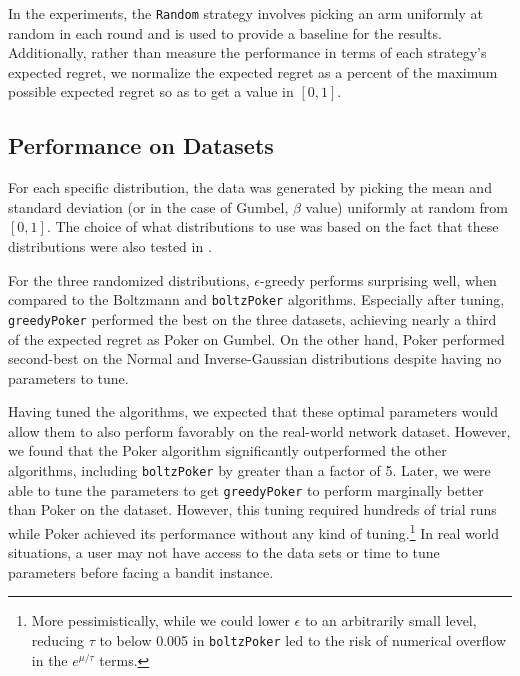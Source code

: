 \documentclass[12pt]{article}
\begin{document}
In the experiments, the \texttt{Random} strategy involves picking an arm uniformly at random in each round and is used to provide a baseline for the results.  Additionally,
rather than measure the performance in terms of each strategy's expected regret, we normalize the expected regret as a percent of the maximum possible expected regret so as to get a value in $[0,1]$. 

\subsection{Performance on Datasets}
For each specific distribution, the data was generated by picking the mean and standard deviation (or in the case of Gumbel, $\beta$ value) uniformly at random from $[0,1]$.  The choice of what
distributions to use was based on the fact that these distributions were also tested in \cite{Kuleshov}. 

For the three randomized distributions, $\epsilon$-greedy performs surprising well, when compared to the Boltzmann and \texttt{boltzPoker} algorithms.  Especially after tuning, 
\texttt{greedyPoker} performed the best on the three datasets, achieving nearly a third of the expected regret as Poker on Gumbel.  On the other hand, Poker performed second-best
on the Normal and Inverse-Gaussian distributions despite having no parameters to tune.

Having tuned the algorithms, we expected that these optimal parameters would allow them to also perform favorably on the real-world network dataset. However, we found that
the Poker algorithm significantly outperformed the other algorithms, including \texttt{boltzPoker} by greater than a factor of 5. Later, we were able to tune the parameters
to get \texttt{greedyPoker} to perform marginally better than Poker on the dataset. However, this tuning required hundreds of trial runs while Poker achieved its performance
without any kind of tuning.\footnote{More pessimistically, while we could lower $\epsilon$ to an arbitrarily small level, reducing $\tau$ to below 0.005 in \texttt{boltzPoker} led to the risk of numerical overflow in the $e^{\mu / \tau}$ terms.} In real world situations, a user may not have access to the data sets or time to tune parameters before facing a bandit instance.
\end{document}

